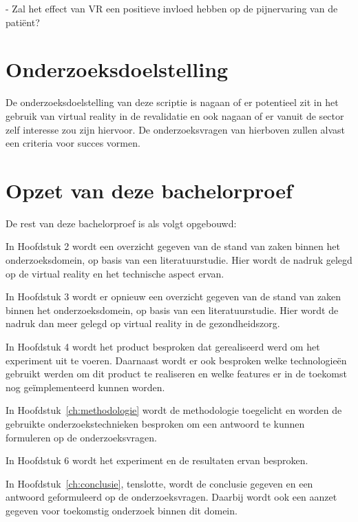 - Zal het effect van VR een positieve invloed hebben op de pijnervaring van de patiënt?


\section{Onderzoeksdoelstelling}
\label{sec:onderzoeksdoelstelling}
De onderzoeksdoelstelling van deze scriptie is nagaan of er potentieel zit in het gebruik van virtual reality in de revalidatie en ook nagaan of er vanuit de sector zelf interesse zou zijn hiervoor. De onderzoeksvragen van hierboven zullen alvast een criteria voor succes vormen.


\section{Opzet van deze bachelorproef}
\label{sec:opzet-bachelorproef}


De rest van deze bachelorproef is als volgt opgebouwd:

In Hoofdstuk 2 wordt een overzicht gegeven van de stand van zaken binnen het onderzoeksdomein, op basis van een literatuurstudie. Hier wordt de nadruk gelegd op de virtual reality en het technische aspect ervan.

In Hoofdstuk 3 wordt er opnieuw een overzicht gegeven van de stand van zaken binnen het onderzoeksdomein, op basis van een literatuurstudie. Hier wordt de nadruk dan meer gelegd op virtual reality in de gezondheidszorg.

In Hoofdstuk 4 wordt het product besproken dat gerealiseerd werd om het experiment uit te voeren. Daarnaast wordt er ook besproken welke technologieën gebruikt werden om dit product te realiseren en welke features er in de toekomst nog geïmplementeerd kunnen worden.

In Hoofdstuk~\ref{ch:methodologie} wordt de methodologie toegelicht en worden de gebruikte onderzoekstechnieken besproken om een antwoord te kunnen formuleren op de onderzoeksvragen.

In Hoofdstuk 6 wordt het experiment en de resultaten ervan besproken.

In Hoofdstuk~\ref{ch:conclusie}, tenslotte, wordt de conclusie gegeven en een antwoord geformuleerd op de onderzoeksvragen. Daarbij wordt ook een aanzet gegeven voor toekomstig onderzoek binnen dit domein.


